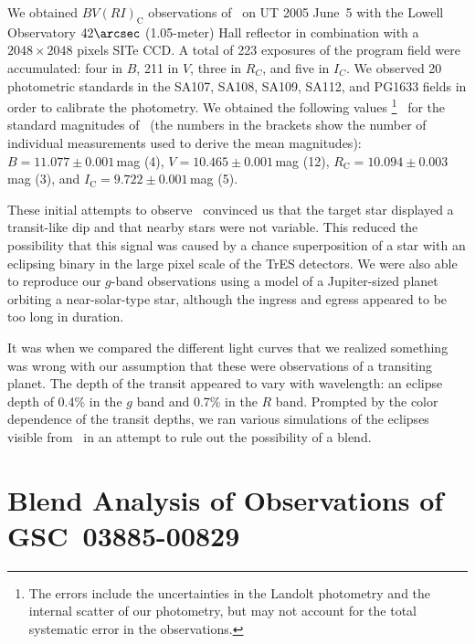 We obtained $BV(RI)_{\mathrm C}$ observations of \gscOTE\ on UT 2005 June~5
with the Lowell Observatory $42\arcsec$ (1.05-meter) Hall reflector in
combination with a $2048 \times 2048 $ pixels SITe CCD. A total of 223
exposures of the program field were accumulated: four in $B$, 211 in
$V$, three in $R_C$, and five in $I_C$. We observed 20 photometric
standards in the SA107, SA108, SA109, SA112, and PG1633 fields
\citep{Landolt:aj:1992a} in order to calibrate the photometry. We
obtained the following values%
\footnote{The errors include the uncertainties in the Landolt
  photometry and the internal scatter of our photometry, but may not
  account for the total systematic error in the observations.}%
\ for the standard magnitudes of \gscOTE\ (the numbers in the brackets
show the number of individual measurements used to derive the mean
magnitudes): $B = 11.077 \pm 0.001$\,mag (4), $V = 10.465 \pm 0.001$\,mag (12), $R_{\mathrm C} = 10.094 \pm 0.003$\,mag (3), and $I_{\mathrm C} = 9.722 \pm 0.001$\,mag (5).

These initial attempts to observe \gscOTE\ convinced us that the target
star displayed a transit-like dip and that nearby stars were not
variable. This reduced the possibility that this signal was caused by
a chance superposition of a star with an eclipsing binary in the large
pixel scale of the TrES detectors. We were also able to reproduce our
$g$-band observations using a model of a Jupiter-sized planet
orbiting a near-solar-type star, although the ingress and egress
appeared to be too long in duration.

It was when we compared the different light curves that we realized
something was wrong with our assumption that these were observations
of a transiting planet. The depth of the transit appeared to vary with
wavelength: an eclipse depth of 0.4\% in the $g$ band and 0.7\% in the
$R$ band. Prompted by the color dependence of the transit depths, we
ran various simulations of the eclipses visible from \gscOTE\ in an
attempt to rule out the possibility of a blend.

\section{Blend Analysis of Observations of \\ \mbox{GSC 03885-00829}}\label{cha:gsc:sec:blend}

